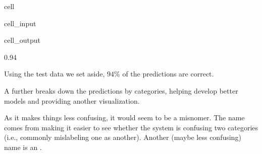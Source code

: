 \documentclass[letterpaper,10pt,english]{jupyterBook}
\begin{document}
\begin{sphinxuseclass}{cell}\begin{sphinxVerbatimInput}

\begin{sphinxuseclass}{cell_input}
\begin{sphinxVerbatim}[commandchars=\\\{\}]
  
  
\end{sphinxVerbatim}

\end{sphinxuseclass}\end{sphinxVerbatimInput}
\begin{sphinxVerbatimOutput}

\begin{sphinxuseclass}{cell_output}
\begin{sphinxVerbatim}[commandchars=\\\{\}]
0.94
\end{sphinxVerbatim}

\end{sphinxuseclass}\end{sphinxVerbatimOutput}

\end{sphinxuseclass}
\sphinxAtStartPar
Using the test data we set aside, \(94\%\) of the predictions are correct.

\label{\detokenize{task2_c/example_sup_class/sup_class_ex-accuracy:sup-class-ex-accuracy-confusion-matrix}}
\sphinxAtStartPar
A  further breaks down the predictions by categories, helping develop better models and providing another visualization.

\begin{sphinxShadowBox}

\sphinxAtStartPar
As it makes things less confusing, it would seem to be a misnomer. The name comes from making it easier to see whether the system is confusing two categories (i.e., commonly mislabeling one as another). Another (maybe less confusing) name is an .
\end{sphinxShadowBox}
\end{document}
